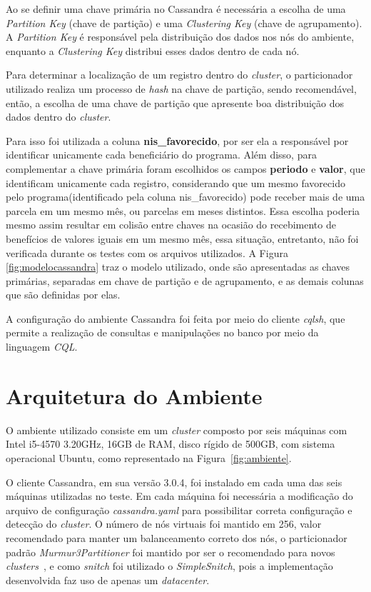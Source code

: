 Ao se definir uma chave primária no Cassandra é necessária a escolha de uma \emph{Partition Key} (chave de partição) e uma \emph{Clustering Key} (chave de agrupamento). A \emph{Partition Key} é responsável pela distribuição dos dados nos nós do ambiente, enquanto a \emph{Clustering Key} distribui esses dados dentro de cada nó.

Para determinar a localização de um registro dentro do \emph{cluster}, o particionador utilizado realiza um processo de \emph{hash} na chave de partição, sendo recomendável, então, a escolha de uma chave de partição que apresente boa distribuição dos dados dentro do \emph{cluster}. 

Para isso foi utilizada a coluna \textbf{nis\_favorecido}, por ser ela a responsável por identificar unicamente cada beneficiário do programa. Além disso, para complementar a chave primária foram escolhidos os campos \textbf{periodo} e \textbf{valor}, que identificam unicamente cada registro, considerando que um mesmo favorecido pelo programa(identificado pela coluna nis\_favorecido) pode receber mais de uma parcela em um mesmo mês, ou parcelas em meses distintos. Essa escolha poderia mesmo assim resultar em colisão entre chaves na ocasião do recebimento de benefícios de valores iguais em um mesmo mês, essa situação, entretanto, não foi verificada durante os testes com os arquivos utilizados. A Figura \ref{fig:modelocassandra} traz o modelo utilizado, onde são apresentadas as chaves primárias, separadas em chave de partição e de agrupamento, e as demais colunas que são definidas por elas.


A configuração do ambiente Cassandra foi feita por meio do cliente \emph{cqlsh}, que permite a realização de consultas e manipulações no banco por meio da linguagem \emph{CQL}.

\section{Arquitetura do Ambiente}
O ambiente utilizado consiste em um \emph{cluster} composto por seis máquinas com Intel i5-4570 3.20GHz, 16GB de RAM, disco rígido de 500GB, com sistema operacional Ubuntu, como representado na Figura~\ref{fig:ambiente}.


O cliente Cassandra, em sua versão 3.0.4, foi instalado em cada uma das seis máquinas utilizadas no teste. Em cada máquina foi necessária a modificação do arquivo de configuração \emph{cassandra.yaml} para possibilitar correta configuração e detecção do \emph{cluster}. O número de nós virtuais foi mantido em 256, valor recomendado para manter um balanceamento correto dos nós, o particionador padrão \emph{Murmur3Partitioner} foi mantido por ser o recomendado para novos \emph{clusters}~\cite{cassandrapartitioners}, e como \emph{snitch} foi utilizado o \emph{SimpleSnitch}, pois a implementação desenvolvida faz uso de apenas um \emph{datacenter}. 

